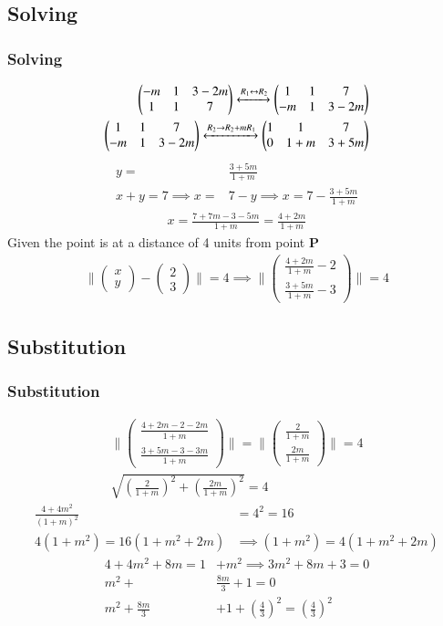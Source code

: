 \documentclass{beamer}
\providecommand{\brak}[1]{\ensuremath{\left(#1\right)}}
\theoremstyle{remark}
\providecommand{\norm}[1]{\lVert#1\rVert}
\newcommand{\myvec}[1]{\ensuremath{\begin{pmatrix}#1\end{pmatrix}}}
\let\vec\mathbf
\numberwithin{equation}{section}
\begin{document}
\subsection{Solving}
\begin{frame}
\frametitle{Solving}
\begin{align}
\myvec{-m & 1 & 3-2m \\ 1 &1 & 7} \xleftrightarrow{R_1\leftrightarrow R_2} \myvec{1 &1 & 7 \\ -m & 1 & 3-2m}\\
\myvec{1 &1 & 7 \\ -m & 1 & 3-2m}\xleftrightarrow{R_2\rightarrow R_2+mR_1} 
\myvec{1 & 1& 7 \\0 & 1+m & 3+5m}
\end{align}
\begin{align}
y=&\frac{3+5m}{1+m}\\
x+y=7\implies x=&7-y \implies x=7-\frac{3+5m}{1+m}
\end{align}
\begin{align}
x=\frac{7+7m-3-5m}{1+m}=\frac{4+2m}{1+m}
\end{align}
Given the point is at a distance of 4 units from point $\vec{P}$
\begin{align}
  \norm{\myvec{x\\y}-\myvec{2\\3}}=4 \implies \norm{\myvec{\frac{4+2m}{1+m}-2\\\frac{3+5m}{1+m}-3}}=4
\end{align}
\end{frame}
\subsection{Substitution}
\begin{frame}
\frametitle{Substitution}
\begin{align}
\norm{\myvec{\frac{4+2m-2-2m}{1+m}\\ \frac{3+5m-3-3m}{1+m}}}=\norm{\myvec{\frac{2}{1+m}\\ \frac{2m}{1+m}}}=4\\
\sqrt{\brak{\frac{2}{1+m}}^2+{\brak{\frac{2m}{1+m}}^2}}=4 
\end{align}
\begin{align}
\frac{4+4m^2}{\brak{1+m}^2}&=4^2=16 \\
4\brak{1+m^2}=16\brak{1+m^2+2m} &\implies \brak{1+m^2}=4\brak{1+m^2+2m} 
\end{align}
\begin{align}
4+4m^2+8m=1&+m^2 \implies 3m^2+8m+3=0 \\
m^2+&\frac{8m}{3}+1=0 \\
m^2+\frac{8m}{3}&+1+\brak{\frac{4}{3}}^2=\brak{\frac{4}{3}}^2 
\end{align}
\end{frame}
\end{document}
